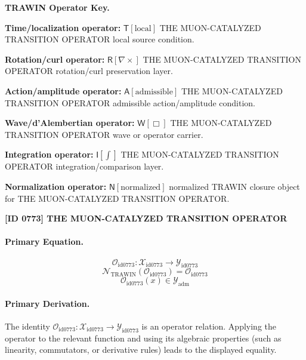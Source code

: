 \par\vspace{0.45\baselineskip}
\noindent\begin{minipage}[t]{\linewidth}
\begingroup
\small
\raggedright
\textbf{TRAWIN Operator Key.}\par
\noindent\textbf{Time/localization operator:} $\mathsf{T}\!\left[\mathrm{local}\right]$ THE MUON-CATALYZED TRANSITION OPERATOR local source condition.\par
\noindent\textbf{Rotation/curl operator:} $\mathsf{R}\!\left[\nabla\times\right]$ THE MUON-CATALYZED TRANSITION OPERATOR rotation/curl preservation layer.\par
\noindent\textbf{Action/amplitude operator:} $\mathsf{A}\!\left[\mathrm{admissible}\right]$ THE MUON-CATALYZED TRANSITION OPERATOR admissible action/amplitude condition.\par
\noindent\textbf{Wave/d'Alembertian operator:} $\mathsf{W}\!\left[\Box\right]$ THE MUON-CATALYZED TRANSITION OPERATOR wave or operator carrier.\par
\noindent\textbf{Integration operator:} $\mathsf{I}\!\left[\int\right]$ THE MUON-CATALYZED TRANSITION OPERATOR integration/comparison layer.\par
\noindent\textbf{Normalization operator:} $\mathsf{N}\!\left[\mathrm{normalized}\right]$ normalized TRAWIN closure object for THE MUON-CATALYZED TRANSITION OPERATOR.\par
\endgroup
\end{minipage}

\clearpage
\noindent\textbf{[ID 0773] THE MUON-CATALYZED TRANSITION OPERATOR}\par
\vspace{0.35em}
\paragraph{Primary Equation.}
\[
\mathcal{O}_{\mathrm{id0773}}:\mathcal{X}_{\mathrm{id0773}}\longrightarrow\mathcal{Y}_{\mathrm{id0773}}
\]
\[
\mathcal{N}_{\mathrm{TRAWIN}}(\mathcal{O}_{\mathrm{id0773}})=\mathcal{O}_{\mathrm{id0773}}
\]
\[
\mathcal{O}_{\mathrm{id0773}}(x)\in\mathcal{Y}_{\mathrm{adm}}
\]

\paragraph{Primary Derivation.}
The identity \( \mathcal{O}_{\mathrm{id0773}}:\mathcal{X}_{\mathrm{id0773}}\longrightarrow\mathcal{Y}_{\mathrm{id0773}} \) is an operator relation. Applying the operator to the relevant function and using its algebraic properties (such as linearity, commutators, or derivative rules) leads to the displayed equality.
